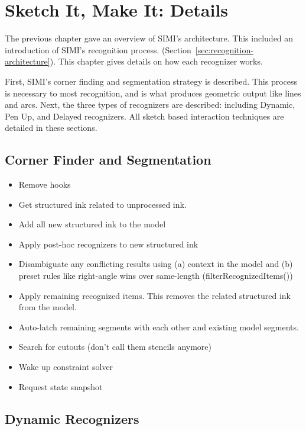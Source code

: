 \chapter{Sketch It, Make It: Details}

The previous chapter gave an overview of SIMI's architecture. This
included an introduction of SIMI's recognition process.
(Section~\ref{sec:recognition-architecture}). This chapter gives
details on how each recognizer works. 

First, SIMI's corner finding and segmentation strategy is
described. This process is necessary to most recognition, and is what
produces geometric output like lines and arcs. Next, the three types
of recognizers are described: including Dynamic, Pen Up, and Delayed
recognizers. All sketch based interaction techniques are detailed in
these sections.

\section{Corner Finder and Segmentation}
\label{sec:corner-finder}




\begin{itemize}
\item Remove hooks
\item Get structured ink related to unprocessed ink.
\item Add all new structured ink to the model
\item Apply post-hoc recognizers to new structured ink
\item Disambiguate any conflicting results using (a) context in the
  model and (b) preset rules like right-angle wins over same-length
  (filterRecognizedItems())
\item Apply remaining recognized items. This removes the related
  structured ink from the model.
\item Auto-latch remaining segments with each other and existing model
  segments.
\item Search for cutouts (don't call them stencils anymore)
\item Wake up constraint solver
\item Request state snapshot
\end{itemize}

\section{Dynamic Recognizers}

